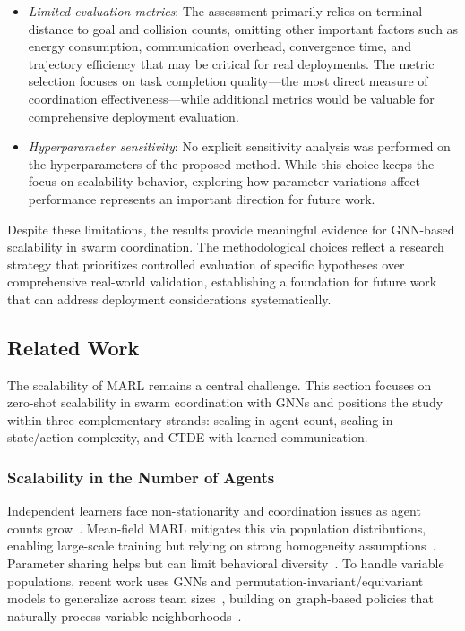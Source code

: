\begin{itemize}
    \item \emph{Limited evaluation metrics}: The assessment primarily relies on terminal distance to goal and collision counts,
     omitting other important factors such as energy consumption, communication overhead, convergence time, 
     and trajectory efficiency that may be critical for real deployments.
    The metric selection focuses on task completion quality---the most direct measure of coordination effectiveness---while additional metrics 
    would be valuable for comprehensive deployment evaluation.

    \item {\emph{Hyperparameter sensitivity}: No explicit sensitivity analysis was performed on the hyperparameters of the proposed method. While this choice keeps the focus on scalability behavior, exploring how parameter variations affect performance represents an important direction for future work.}
\end{itemize}

 Despite these limitations, 
 the results provide meaningful evidence for GNN-based scalability in swarm coordination. 
%
The methodological choices reflect a research strategy that prioritizes controlled 
 evaluation of specific hypotheses over comprehensive real-world validation, 
 establishing a foundation for future work that can address deployment 
 considerations systematically.

\subsection{Related Work}
The scalability of \gls{MARL} remains a central challenge. 
%
This section focuses on zero-shot scalability in swarm coordination with \glspl{GNN}
 and positions the study within three complementary strands: 
 scaling in agent count, scaling in state/action complexity, and CTDE with learned communication.

\subsubsection{Scalability in the Number of Agents}
Independent learners face non-stationarity 
 and coordination issues as agent counts grow~\cite{DBLP:journals/smca/BusonuiBDS08,tan1993multiagent}.
%
Mean-field \gls{MARL} mitigates this via population distributions, 
 enabling large-scale training but relying on strong homogeneity 
 assumptions~\cite{DBLP:conf/icml/YangLLZZWY18,subramanian2022adaptive,mondal2022approximate}. 
% 
Parameter sharing helps but can limit behavioral diversity~\cite{li2021celebrating}. 
% 
To handle variable populations, 
 recent work uses \glspl{GNN} and permutation-invariant/equivariant models to generalize 
 across team sizes~\cite{nayak2023scalable,lin2024hgap,mahjoub2024performant},
 building on graph-based policies that naturally process variable 
 neighborhoods~\cite{DBLP:conf/iclr/JiangDHL20,khan2019graph,zhou2020learning}.

